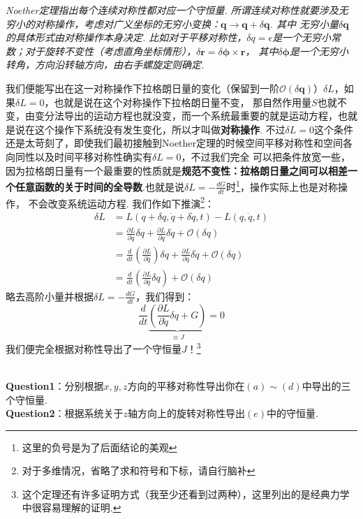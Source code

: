 \documentclass[UTF8,fontset=windows,oneside]{ctexbook}
\begin{document}
{
    \itshape
    Noether定理指出每个连续对称性都对应一个守恒量. 所谓连续对称性就要涉及无穷小的对称操作，考虑对广义坐标的无穷小变换：$\mathbf{q}\rightarrow\mathbf{q}+\delta\mathbf{q}$. 其中
    无穷小量$\delta\mathbf{q}$的具体形式由对称操作本身决定. 比如对于平移对称性，$\delta q=\epsilon$是一个无穷小常数；对于旋转不变性（考虑直角坐标情形），$\delta \mathbf{r}=\delta\mathbf{\phi}\times\mathbf{r}$，
    其中$\delta\mathbf{\phi}$是一个无穷小转角，方向沿转轴方向，由右手螺旋定则确定.

    我们便能写出在这一对称操作下拉格朗日量的变化（保留到一阶$\mathcal{O}(\delta\mathbf{q})$）$\delta L$，如果$\delta L=0$，也就是说在这个对称操作下拉格朗日量不变，
    那自然作用量$S$也就不变，由变分法导出的运动方程也就没变，而一个系统最重要的就是运动方程，也就是说在这个操作下系统没有发生变化，所以才叫做\textbf{对称操作}.
    不过$\delta L=0$这个条件还是太苛刻了，即使我们最初接触到Noether定理的时候空间平移对称性和空间各向同性以及时间平移对称性确实有$\delta L=0$，不过我们完全
    可以把条件放宽一些，因为拉格朗日量有一个最重要的性质就是\textbf{规范不变性：拉格朗日量之间可以相差一个任意函数的关于时间的全导数}.也就是说$\delta L=-\frac{dG}{dt}$时\footnote{这里的负号是为了后面结论的美观}，操作实际上也是对称操作，
    不会改变系统运动方程. 我们作如下推演\footnote{对于多维情况，省略了求和符号和下标，请自行脑补}：
    \begin{align*}
        \delta L&=L(q+\delta q,\dot q+\delta \dot q,t)-L(q,\dot q,t)\\
        &=\frac{\partial L}{\partial q}\delta q+\frac{\partial L}{\partial \dot q}\delta \dot q + \mathcal{O}(\delta q)\\
        &=\frac{d}{dt}\left(\frac{\partial L}{\partial \dot q}\right)\delta q+\frac{\partial L}{\partial \dot q}\delta\dot q+ \mathcal{O}(\delta q)\\
        &=\frac{d}{dt}\left(\frac{\partial L}{\partial \dot q}\delta q\right)+ \mathcal{O}(\delta q)
    \end{align*}
    略去高阶小量并根据$\delta L=-\frac{dG}{dt}$，我们得到：
    \begin{equation}
        \boxed{
            \frac{d}{dt}\underbrace{\left(\frac{\partial L}{\partial \dot q}\delta q+G\right)}_{\equiv J}=0
        }
    \end{equation}
    我们便完全根据对称性导出了一个守恒量$J$！\footnote{这个定理还有许多证明方式（我至少还看到过两种），这里列出的是经典力学中很容易理解的证明.}
}\\
\textbf{Question1}：分别根据$x,y,z$方向的平移对称性导出你在$(a)\sim(d)$中导出的三个守恒量.\\
\textbf{Question2}：根据系统关于$z$轴方向上的旋转对称性导出$(e)$中的守恒量.
\end{document}
